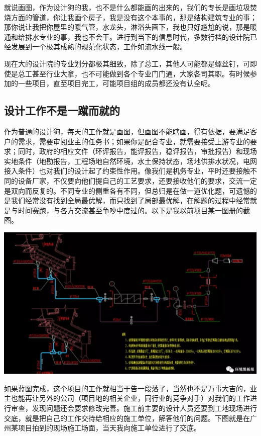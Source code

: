 \documentclass[]{book}
\begin{document}
就说画图，作为设计狗的我，也不是什么都能画的出来的，我们的专长是画垃圾焚烧方面的管道，你让我画个房子，我是没有这个本事的，那是结构建筑专业的事；那你说让我把你屋里的暖气管，水龙头，淋浴头画下，我也只好尴尬的说，那是暖通和给排水专业的事，我也不会干。进行到当下的信息时代，多数行档的设计院已经发展到一个极其成熟的规范化状态，工作如流水线一般。

现在大的设计院的专业划分都极其细致，除了总工，其他人可能都是螺丝钉，可即使是总工甚至行业大拿，也不可能做到各个专业门门通，大家各司其职。有时候参加的一些项目，直至项目完工，可能项目组的成员都还没有认全呢。

\subsection{设计工作不是一蹴而就的}

作为普通的设计狗，每天的工作就是画图，但画图不能瞎画，得有依据，要满足客户的需求，需要审阅业主的任务书；如果你是配合专业，就需要接受上游专业的要求；同时，政府的相应文件（环评报告，能评报告，稳评报告，审批报告）和现场实地条件（地勘报告，工程场地自然环境，水土保持状态，场地供排水状况，电网接入条件）也对我们的设计起了约束性作用。像我们是机务专业，平时还要接触不同的设备厂家，不仅要向他们提自己的工艺要求，还要接收他们的要求，交流一定是双向而反复的。不同专业的侧重各有不同，但总归是在做一道优化题，可遗憾的是我们经常没有找到全局最优解，而只找到了局部最优解，在解题的过程中经常就是与时间赛跑，与各方交流甚至争吵中度过的。以下是我以前项目某一图册的截图。

\includegraphics[width=8.33in]{images/sisi2}

如果蓝图完成，这个项目的工作就相当于告一段落了，当然也不是万事大吉的，业主也能再让另外的公司（项目地的相关企业，同行业的竞争对手）对我们的工作进行审查，发现问题还会要求修改完善。施工前主要的设计人员还要到工地现场进行交底，就是把自己的工作交待给相应的施工单位，解答他们的问题。下图就是在广州某项目拍到的现场施工场面，当天我向施工单位进行了交底。
\end{document}
